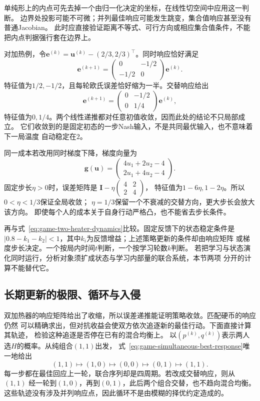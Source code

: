 单纯形上的内点可先去掉一个由归一化决定的坐标，在线性切空间中应用这一判断。
边界处投影可能不可微；并列最佳响应可能发生跳变，集合值响应甚至没有普通Jacobian。
此时应直接验证距离不等式、可行方向或相应集合值条件，不能把内点判据强行套在边界上。

对加热例，令\(\bm e^{(k)}=\bm u^{(k)}-(2/3,2/3)^\top\)。同时响应恰好满足
\begin{equation}
  \bm e^{(k+1)}
  =
  \begin{pmatrix}0&-1/2\\-1/2&0\end{pmatrix}\bm e^{(k)}.
  \label{eq:game-heater-response-error}
\end{equation}
特征值为\(1/2,-1/2\)，且每轮欧氏误差恰好缩为一半。交替响应给出
\[
  \bm e^{(k+1)}
  =
  \begin{pmatrix}0&-1/2\\0&1/4\end{pmatrix}\bm e^{(k)},
\]
特征值为\(0,1/4\)。两个线性递推都对任意初值收敛，因而此处的结论不只局部成立。
它们收敛到的是固定初态的一步Nash输入，不是共同最优输入，也不意味着下一局温度
自动稳定在\(2\)。

同一成本若改用同时梯度下降，梯度向量为
\[
  \bm g(\bm u)=
  \begin{pmatrix}4u_1+2u_2-4\\2u_1+4u_2-4\end{pmatrix}.
\]
固定步长\(\eta>0\)时，误差矩阵是
\(\bm I-\eta\left(\begin{smallmatrix}4&2\\2&4\end{smallmatrix}\right)\)，
特征值为\(1-6\eta,1-2\eta\)。所以\(0<\eta<1/3\)保证全局收敛；
\(\eta=1/3\)保留一个不衰减的交替方向，更大步长会放大该方向。
即使每个人的成本关于自身行动严格凸，也不能省去步长条件。

再与式~\eqref{eq:game-two-heater-dynamics}比较。固定反馈下的状态稳定条件是
\(|0.8-k_1-k_2|<1\)，其中\(k_i\)为反馈增益；上述策略更新的条件却由响应矩阵
或梯度步长决定。一个按局内时间\(t\)判断，一个按学习轮数\(k\)判断。
若把学习与状态演化同时运行，分析对象须扩成状态与学习内部量的联合系统，本节两项
分开的计算不能替代它。

\subsection{长期更新的极限、循环与入侵}
\label{sec:game-limits-cycles}

双加热器的响应矩阵给出了收缩，所以误差递推能证明策略收敛。匹配硬币的响应仍然
可以精确求出，但对抗收益会使双方依次追逐新的最佳行动。下面直接计算其轨迹，
检验这种追逐是否停在已有的混合均衡上。
以\((p^{(k)},q^{(k)})\)表示两人选\(H\)的概率。从纯组合\((1,1)\)出发，
式~\eqref{eq:game-simultaneous-best-response}唯一地给出
\[
  (1,1)\longmapsto(1,0)\longmapsto(0,0)
  \longmapsto(0,1)\longmapsto(1,1).
\]
每一步都在最佳回应上一轮，联合序列却是四周期。若改成交替响应，则从\((1,1)\)
经一轮到\((1,0)\)，再到\((0,1)\)，此后两个组合交替，也不趋向混合均衡。
这些轨迹没有涉及并列响应点，因此循环不是由模糊的择优约定造成的。


